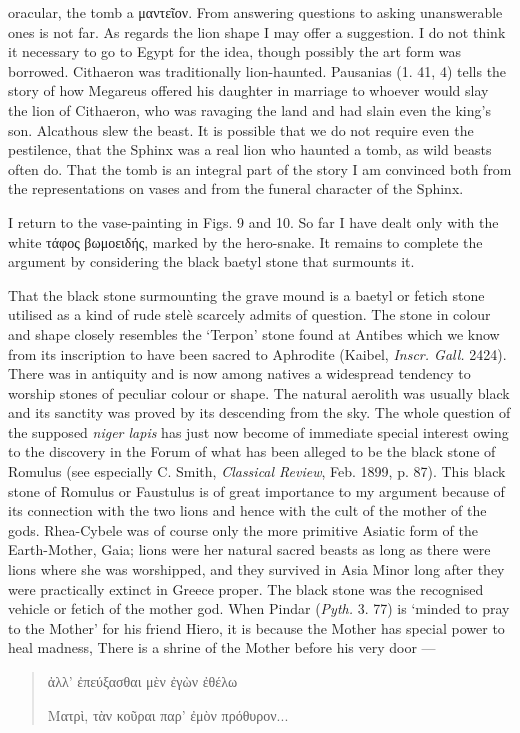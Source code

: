 \documentclass[a4paper, 11pt, oneside, polutonikogreek, english]{article}
\begin{document}
oracular, the tomb a μαντεῖον. From answering questions to asking unanswerable ones is not far. As regards the lion shape I may offer a suggestion. I do not think it necessary to go to Egypt for the idea, though possibly the art form was borrowed. Cithaeron was traditionally lion-haunted. Pausanias (1. 41, 4) tells the story of how Megareus offered his daughter in marriage to whoever would slay the lion of Cithaeron, who was ravaging the land and had slain even the king's son. Alcathous slew the beast. It is possible that we do not require even the pestilence, that the Sphinx was a real lion who haunted a tomb, as wild beasts often do. That the tomb is an integral part of the story I am convinced both from the representations on vases and from the funeral character of the Sphinx.

I return to the vase-painting in Figs. 9 and 10. So far I have dealt only with the white τάφος βωμοειδής, marked by the hero-snake. It remains to complete the argument by considering the black baetyl stone that surmounts it.

That the black stone surmounting the grave mound is a baetyl or fetich stone utilised as a kind of rude stelè scarcely admits of question. The stone in colour and shape closely resembles the `Terpon' stone found at Antibes which we know from its inscription to have been sacred to Aphrodite (Kaibel, \emph{Inscr. Gall.} 2424). There was in antiquity and is now among natives a widespread tendency to worship stones of peculiar colour or shape. The natural aerolith was usually black and its sanctity was proved by its descending from the sky. The whole question of the supposed \emph{niger lapis} has just now become of immediate special interest owing to the discovery in the Forum of what has been alleged to be the black stone of Romulus (see especially C. Smith, \emph{Classical Review}, Feb. 1899, p. 87). This black stone of Romulus or Faustulus is of great importance to my argument because of its connection with the two lions and hence with the cult of the mother of the gods. Rhea-Cybele was of course only the more primitive Asiatic form of the Earth-Mother, Gaia; lions were her natural sacred beasts as long as there were lions where she was worshipped, and they survived in Asia Minor long after they were practically extinct in Greece proper. The black stone was the recognised vehicle or fetich of the mother god. When Pindar (\emph{Pyth.} 3. 77) is `minded to pray to the Mother' for his friend Hiero, it is because the Mother has special power to heal madness, There is a shrine of the Mother before his very door ---
\begin{quotation}
ἀλλ' ἐπεύξασθαι μὲν ἐγὼν ἐθέλω

Ματρὶ, τὰν κοῦραι παρ' ἐμὸν πρόθυρον...
\end{quotation}
\end{document}
